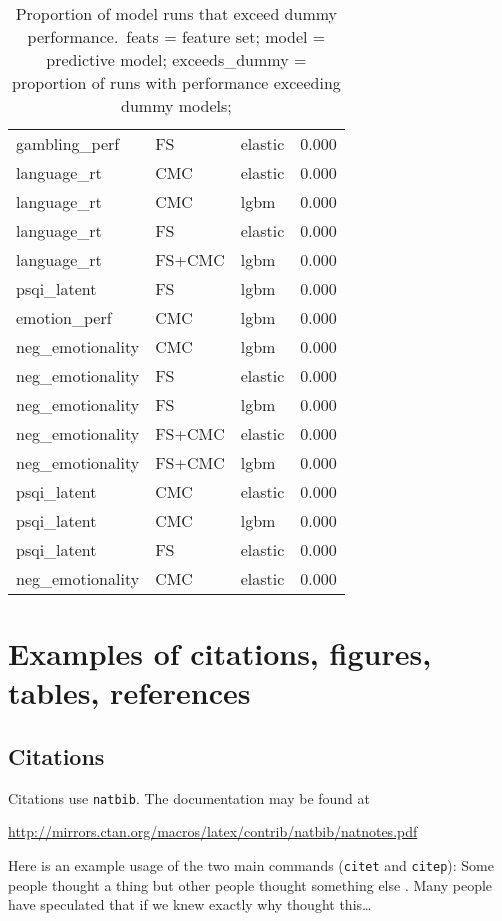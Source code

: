 \documentclass{article}
\begin{document}
\begin{table}
\begin{tabular}{lllr}
gambling\_perf & FS & elastic & 0.000 \\
language\_rt & CMC & elastic & 0.000 \\
language\_rt & CMC & lgbm & 0.000 \\
language\_rt & FS & elastic & 0.000 \\
language\_rt & FS+CMC & lgbm & 0.000 \\
psqi\_latent & FS & lgbm & 0.000 \\
emotion\_perf & CMC & lgbm & 0.000 \\
neg\_emotionality & CMC & lgbm & 0.000 \\
neg\_emotionality & FS & elastic & 0.000 \\
neg\_emotionality & FS & lgbm & 0.000 \\
neg\_emotionality & FS+CMC & elastic & 0.000 \\
neg\_emotionality & FS+CMC & lgbm & 0.000 \\
psqi\_latent & CMC & elastic & 0.000 \\
psqi\_latent & CMC & lgbm & 0.000 \\
psqi\_latent & FS & elastic & 0.000 \\
neg\_emotionality & CMC & elastic & 0.000 \\
\bottomrule
\end{tabular}

\footnotesize
\caption{%
Proportion of model runs that exceed dummy performance.\
feats = feature set; model = predictive model;
exceeds\_dummy = proportion of runs with performance exceeding dummy models;
}
\normalsize
\label{tab:cmc-model-p-predictive}
\end{table}


\section{Examples of citations, figures, tables, references}
\label{sec:others}

\subsection{Citations}
Citations use \verb+natbib+. The documentation may be found at
\begin{center}
	\url{http://mirrors.ctan.org/macros/latex/contrib/natbib/natnotes.pdf}
\end{center}

Here is an example usage of the two main commands (\verb+citet+ and
\verb+citep+): Some people thought a thing
\citep{buyssePittsburghSleepQuality1989} but other people thought something
else \citep{cattellScientificUseFactor1978}. Many people have speculated that
if we knew exactly why \citet{cattellScientificUseFactor1978} thought
this\dots
\end{document}
